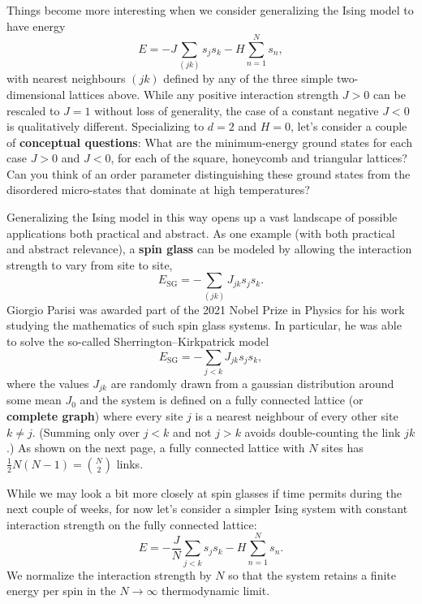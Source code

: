 \documentclass[12 pt]{article} %
\begin{document}
Things become more interesting when we consider generalizing the Ising model to have energy
\begin{equation*}
  E = -J \sum_{(jk)} s_j s_k - H \sum_{n = 1}^N s_n,
\end{equation*}
with nearest neighbours $(jk)$ defined by any of the three simple two-dimensional lattices above.
While any positive interaction strength $J > 0$ can be rescaled to $J = 1$ without loss of generality, the case of a constant negative $J < 0$ is qualitatively different.
Specializing to $d = 2$ and $H = 0$, let's consider a couple of \textbf{conceptual questions}:
What are the minimum-energy ground states for each case $J > 0$ and $J < 0$, for each of the square, honeycomb and triangular lattices?
Can you think of an order parameter distinguishing these ground states from the disordered micro-states that dominate at high temperatures?

Generalizing the Ising model in this way opens up a vast landscape of possible applications both practical and abstract.
As one example (with both practical and abstract relevance), a \textbf{spin glass} can be modeled by allowing the interaction strength to vary from site to site,
\begin{equation*}
  E_{\text{SG}} = -\sum_{(jk)} J_{jk} s_j s_k.
\end{equation*}
Giorgio Parisi was awarded part of the 2021 Nobel Prize in Physics for his work studying the mathematics of such spin glass systems.
In particular, he was able to solve the so-called Sherrington--Kirkpatrick model
\begin{equation*}
  E_{\text{SG}} = -\sum_{j < k} J_{jk} s_j s_k,
\end{equation*}
where the values $J_{jk}$ are randomly drawn from a gaussian distribution around some mean $J_0$ and the system is defined on a fully connected lattice (or \textbf{complete graph}) where every site $j$ is a nearest neighbour of every other site $k \ne j$.
(Summing only over $j < k$ and not $j > k$ avoids double-counting the link $jk$.)
As shown on the next page, a fully connected lattice with $N$ sites has $\frac{1}{2} N (N - 1) = \binom{N}{2}$ links.

While we may look a bit more closely at spin glasses if time permits during the next couple of weeks, for now let's consider a simpler Ising system with constant interaction strength on the fully connected lattice:
\begin{equation*}
  E = -\frac{J}{N} \sum_{j < k} s_j s_k - H \sum_{n = 1}^N s_n.
\end{equation*}
We normalize the interaction strength by $N$ so that the system retains a finite energy per spin in the $N \to \infty$ thermodynamic limit.
\end{document}
